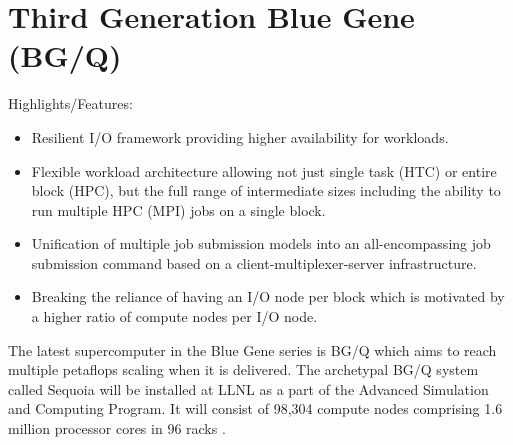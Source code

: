 \section {Third Generation Blue Gene (BG/Q)}

Highlights/Features:
\begin{itemize}
\item Resilient I/O framework providing higher availability for workloads.

\item Flexible workload architecture allowing not just single task (HTC) or entire block (HPC), but the 
full range of intermediate sizes including the ability to run multiple HPC (MPI) jobs on a single block.

\item Unification of multiple job submission models into an all-encompassing job submission command based 
on a client-multiplexer-server infrastructure.

\item Breaking the reliance of having an I/O node per block which is motivated by a higher ratio of compute 
nodes per I/O node. 

\end{itemize}

The latest supercomputer in the Blue Gene series is BG/Q which aims to reach multiple petaflops scaling 
when it is delivered. The archetypal BG/Q system called Sequoia will be installed at LLNL as a part of the 
Advanced Simulation and Computing Program. It will consist of 98,304 compute nodes comprising 1.6 million 
processor cores in 96 racks \cite{website:sequoia}.

